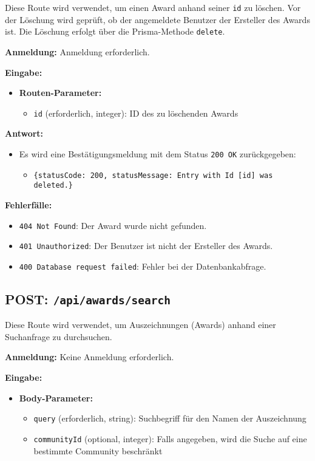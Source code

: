 \documentclass[a4paper,12pt]{article}
\begin{document}
Diese Route wird verwendet, um einen Award anhand seiner \texttt{id} zu
löschen. Vor der Löschung wird geprüft, ob der angemeldete Benutzer der
Ersteller des Awards ist. Die Löschung erfolgt über die Prisma-Methode
\texttt{delete}.

\textbf{Anmeldung:} Anmeldung erforderlich.

\textbf{Eingabe:}
\begin{itemize}
    \item \textbf{Routen-Parameter:}
    \begin{itemize}
        \item \texttt{id} (erforderlich, integer):
            ID des zu löschenden Awards
    \end{itemize}
\end{itemize}

\textbf{Antwort:}
\begin{itemize}
    \item Es wird eine Bestätigungsmeldung mit dem Status
        \texttt{200 OK} zurückgegeben:
    \begin{itemize}
        \item \texttt{\{statusCode: 200,
            statusMessage: Entry with Id [id] was deleted.\}}
    \end{itemize}
\end{itemize}

\textbf{Fehlerfälle:}
\begin{itemize}
    \item \texttt{404 Not Found}:
        Der Award wurde nicht gefunden.
    \item \texttt{401 Unauthorized}:
        Der Benutzer ist nicht der Ersteller des Awards.
    \item \texttt{400 Database request failed}:
        Fehler bei der Datenbankabfrage.
\end{itemize}

\newpage
\subsection{POST: \texttt{/api/awards/search}}

Diese Route wird verwendet, um Auszeichnungen (Awards) anhand einer Suchanfrage
zu durchsuchen.

\textbf{Anmeldung:} Keine Anmeldung erforderlich.

\textbf{Eingabe:}
\begin{itemize}
    \item \textbf{Body-Parameter:}
    \begin{itemize}
        \item \texttt{query} (erforderlich, string):
            Suchbegriff für den Namen der Auszeichnung
        \item \texttt{communityId} (optional, integer):
            Falls angegeben, wird die Suche auf eine bestimmte Community
            beschränkt
    \end{itemize}
\end{itemize}
\end{document}
